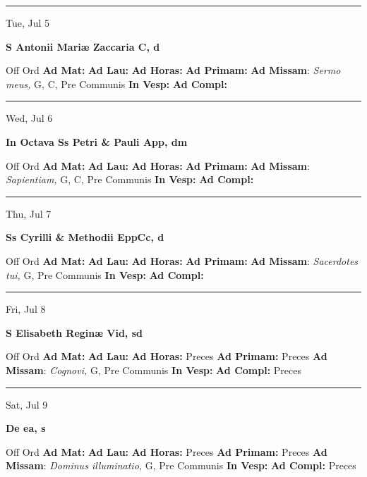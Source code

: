 \documentclass[letterpaper, 10pt]{article}
\begin{document}
\hrule
\begin{center}
Tue, Jul 5
\end{center}\textbf{ \large S Antonii Mariæ Zaccaria C, \textnormal{\normalsize d}}
\begin{justify}
Off Ord
\textbf{Ad Mat: }
\textbf{Ad Lau: }
\textbf{Ad Horas: }
\textbf{Ad Primam: }
\textbf{Ad Missam}: \textit{Sermo meus,} G, C, Pre Communis
\textbf{In Vesp: }
\textbf{Ad Compl: }\end{justify}



\hrule
\begin{center}
Wed, Jul 6
\end{center}\textbf{ \large In Octava Ss Petri \& Pauli App, \textnormal{\normalsize dm}}
\begin{justify}
Off Ord
\textbf{Ad Mat: }
\textbf{Ad Lau: }
\textbf{Ad Horas: }
\textbf{Ad Primam: }
\textbf{Ad Missam}: \textit{Sapientiam,} G, C, Pre Communis
\textbf{In Vesp: }
\textbf{Ad Compl: }\end{justify}



\hrule
\begin{center}
Thu, Jul 7
\end{center}\textbf{ \large Ss Cyrilli \& Methodii EppCc, \textnormal{\normalsize d}}
\begin{justify}
Off Ord
\textbf{Ad Mat: }
\textbf{Ad Lau: }
\textbf{Ad Horas: }
\textbf{Ad Primam: }
\textbf{Ad Missam}: \textit{Sacerdotes tui,} G, Pre Communis
\textbf{In Vesp: }
\textbf{Ad Compl: }\end{justify}



\hrule
\begin{center}
Fri, Jul 8
\end{center}\textbf{ \large S Elisabeth Reginæ Vid, \textnormal{\normalsize sd}}
\begin{justify}
Off Ord
\textbf{Ad Mat: }
\textbf{Ad Lau: }
\textbf{Ad Horas: }Preces
\textbf{Ad Primam: }Preces
\textbf{Ad Missam}: \textit{Cognovi,} G, Pre Communis
\textbf{In Vesp: }
\textbf{Ad Compl: }Preces\end{justify}



\hrule
\begin{center}
Sat, Jul 9
\end{center}\textbf{ \large De ea, \textnormal{\normalsize s}}
\begin{justify}
Off Ord
\textbf{Ad Mat: }
\textbf{Ad Lau: }
\textbf{Ad Horas: }Preces
\textbf{Ad Primam: }Preces
\textbf{Ad Missam}: \textit{Dominus illuminatio,} G, Pre Communis
\textbf{In Vesp: }
\textbf{Ad Compl: }Preces\end{justify}
\end{document}
